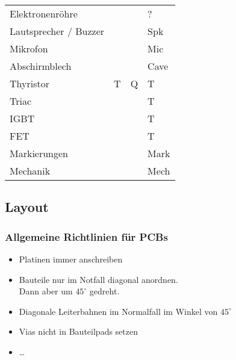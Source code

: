 \begin{table}[h!]
\begin{tabular}{llll}
  \rowcolor{white}  Elektronenröhre         &       &       & ? \\
  \rowcolor{lgray}  Lautsprecher / Buzzer   &       &       & Spk \\
  \rowcolor{white}  Mikrofon                &       &       & Mic \\
  \rowcolor{lgray}  Abschirmblech           &       &       & Cave \\
  \rowcolor{white}  Thyristor               & T     & Q     & T \\
  \rowcolor{lgray}  Triac                   &       &       & T \\
  \rowcolor{white}  IGBT                    &       &       & T \\
  \rowcolor{lgray}  FET                     &       &       & T \\
  \rowcolor{white}  Markierungen            &       &       & Mark \\
  \rowcolor{lgray}  Mechanik                &       &       & Mech
  \end{tabular}
\end{table}

\subsection{Layout}

\subsubsection{Allgemeine Richtlinien für PCBs}
\begin{itemize}
  \item Platinen immer anschreiben
  \item Bauteile nur im Notfall diagonal anordnen. \\
        Dann aber um $45^\circ$ gedreht. 
  \item Diagonale Leiterbahnen im Normalfall im Winkel von $45^\circ$
  \item Vias nicht in Bauteilpads setzen
  \item \dots
\end{itemize}